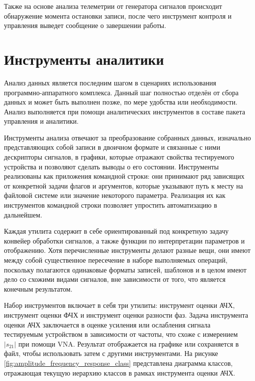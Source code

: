 \documentclass{report}
\begin{document}
Также на основе анализа телеметрии от генератора сигналов происходит обнаружение момента остановки записи, после чего инструмент контроля и управления выведет сообщение о завершении работы.

\section{Инструменты аналитики}

Анализ данных является последним шагом в сценариях использования программно-аппаратного комплекса. Данный шаг полностью отделён от сбора данных и может быть выполнен позже, по мере удобства или необходимости. Анализ выполняется при помощи аналитических инструментов в составе пакета управления и аналитики.

Инструменты анализа отвечают за преобразование собранных данных, изначально представляющих собой записи в двоичном формате и связанные с ними дескрипторы сигналов, в графики, которые отражают свойства тестируемого устройства и позволяют сделать выводы о его состоянии. Инструменты реализованы как приложения командной строки: они принимают ряд зависящих от конкретной задачи флагов и аргументов, которые указывают путь к месту на файловой системе или значение некоторого параметра. Реализация их как инструментов командной строки позволяет упростить автоматизацию в дальнейшем.

Каждая утилита содержит в себе ориентированный под конкретную задачу конвейер обработки сигналов, а также функции по интерпретации параметров и отображению. Хотя перечисленные инструменты делают разные вещи, они имеют между собой существенное пересечение в наборе выполняемых операций, поскольку полагаются одинаковые форматы записей, шаблонов и в целом имеют дело со схожими видами сигналов, вне зависимости от того, что является конечным результатом.

Набор инструментов включает в себя три утилиты: инструмент оценки АЧХ, инструмент оценки ФЧХ и инструмент оценки разности фаз. Задача инструмента оценки АЧХ заключается в оценке усиления или ослабления сигнала тестируемым устройством в зависимости от частоты, что схоже с измерением $|s_{21}|$ при помощи VNA. Результат отображается на графике или сохраняется в файл, чтобы использовать затем с другими инструментами. На рисунке \ref{fig:amplitude_frequency_response_class} представлена диаграмма классов, отражающая текущую иерархию классов в рамках инструмента оценки АЧХ.

\end{document}
